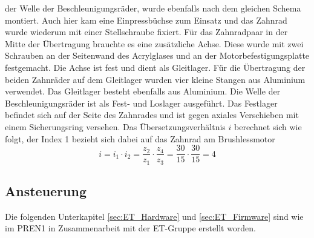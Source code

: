        der Welle der Beschleunigungsräder, wurde ebenfalls nach dem gleichen Schema 
        montiert. Auch hier kam eine Einpressbüchse zum Einsatz und das Zahnrad wurde wiederum mit 
        einer Stellschraube fixiert. Für das Zahnradpaar in der Mitte der Übertragung brauchte es eine 
        zusätzliche Achse. Diese wurde mit zwei Schrauben an der Seitenwand des 
        Acrylglases und an der Motorbefestigungsplatte festgemacht. Die Achse ist fest und dient als 
        Gleitlager. Für die Übertragung der beiden Zahnräder auf dem Gleitlager wurden vier kleine Stangen 
        aus Aluminium verwendet. Das Gleitlager besteht ebenfalls aus Aluminium. Die Welle der 
        Beschleunigungsräder ist als Fest- und Loslager ausgeführt. Das Festlager befindet sich auf 
        der Seite des Zahnrades und ist gegen axiales Verschieben mit einem Sicherungsring versehen. 
        Das Übersetzungsverhältnis $i$ berechnet sich wie folgt, der Index 1 bezieht sich dabei auf 
        das Zahnrad am Brushlessmotor
        \begin{equation}
            i = i_1 \cdot i_2 = \frac{z_2}{z_1} \cdot \frac{z_4}{z_3} = \frac{30}{15} \cdot \frac{30}{15} = 4
        \end{equation}
%
\subsection{Ansteuerung}
Die folgenden Unterkapitel \ref{sec:ET_Hardware} und \ref{sec:ET_Firmware} sind wie im PREN1 in Zusammenarbeit mit der ET-Gruppe erstellt worden.



